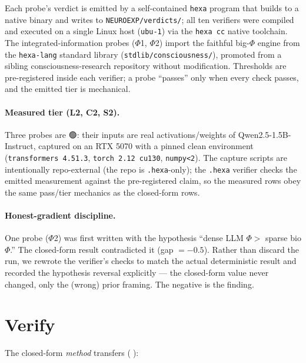 \documentclass[11pt,a4paper]{article}
\providecommand{\tierBlue}{🔵}
\providecommand{\tierGreen}{🟢}
\begin{document}
Each probe's verdict is emitted by a self-contained \texttt{hexa} program
that builds to a native binary and writes to \texttt{NEUROEXP/verdicts/};
all ten verifiers were compiled and executed on a single Linux host
(\texttt{ubu-1}) via the \texttt{hexa cc} native toolchain. The
integrated-information probes ($\Phi$1, $\Phi$2) import the faithful
big-$\Phi$ engine from the \texttt{hexa-lang} standard library
(\texttt{stdlib/consciousness/}), promoted from a sibling
consciousness-research repository without modification. Thresholds are
pre-registered inside each verifier; a probe ``passes'' only when every
check passes, and the emitted tier is mechanical.

\paragraph{Measured tier (L2, C2, S2).} Three probes are $\tierGreen$:
their inputs are real activations/weights of Qwen2.5-1.5B-Instruct,
captured on an RTX 5070 with a pinned clean environment
(\texttt{transformers 4.51.3}, \texttt{torch 2.12 cu130},
\texttt{numpy<2}). The capture scripts are intentionally repo-external
(the repo is \texttt{.hexa}-only); the \texttt{.hexa} verifier checks the
emitted measurement against the pre-registered claim, so the measured
rows obey the same pass/tier mechanics as the closed-form rows.

\paragraph{Honest-gradient discipline.}
One probe ($\Phi$2) was first written with the hypothesis ``dense LLM
$\Phi >$ sparse bio $\Phi$.'' The closed-form result contradicted it
(gap $=-0.5$). Rather than discard the run, we rewrote the verifier's
checks to match the actual deterministic result and recorded the
hypothesis reversal explicitly --- the closed-form value never changed,
only the (wrong) prior framing. The negative is the finding.

\section{Verify}
\label{sec:verify}

The closed-form \emph{method} transfers ($\tierBlue$):
\end{document}
